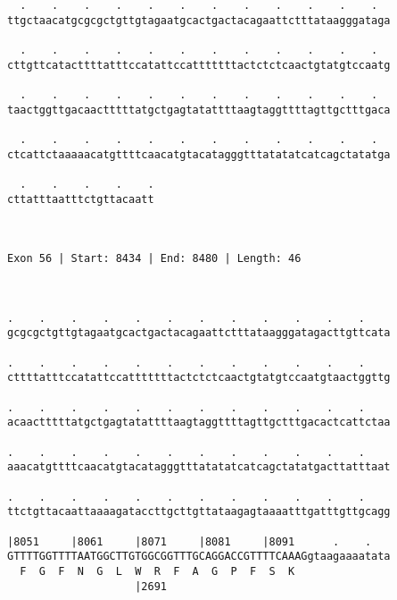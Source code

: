 \documentclass{article}
\begin{document}
\begin{Verbatim}
  .    .    .    .    .    .    .    .    .    .    .    .  
ttgctaacatgcgcgctgttgtagaatgcactgactacagaattctttataagggataga
                                                            
  .    .    .    .    .    .    .    .    .    .    .    .  
cttgttcatacttttatttccatattccatttttttactctctcaactgtatgtccaatg
                                                            
  .    .    .    .    .    .    .    .    .    .    .    .  
taactggttgacaactttttatgctgagtatattttaagtaggttttagttgctttgaca
                                                            
  .    .    .    .    .    .    .    .    .    .    .    .  
ctcattctaaaaacatgttttcaacatgtacatagggtttatatatcatcagctatatga
                                                            
  .    .    .    .    .
cttatttaatttctgttacaatt
                       
                       
 
Exon 56 | Start: 8434 | End: 8480 | Length: 46



.    .    .    .    .    .    .    .    .    .    .    .    
gcgcgctgttgtagaatgcactgactacagaattctttataagggatagacttgttcata
                                                            
.    .    .    .    .    .    .    .    .    .    .    .    
cttttatttccatattccatttttttactctctcaactgtatgtccaatgtaactggttg
                                                            
.    .    .    .    .    .    .    .    .    .    .    .    
acaactttttatgctgagtatattttaagtaggttttagttgctttgacactcattctaa
                                                            
.    .    .    .    .    .    .    .    .    .    .    .    
aaacatgttttcaacatgtacatagggtttatatatcatcagctatatgacttatttaat
                                                            
.    .    .    .    .    .    .    .    .    .    .    .    
ttctgttacaattaaaagataccttgcttgttataagagtaaaatttgatttgttgcagg
                                                            
|8051     |8061     |8071     |8081     |8091      .    .   
GTTTTGGTTTTAATGGCTTGTGGCGGTTTGCAGGACCGTTTTCAAAGgtaagaaaatata
  F  G  F  N  G  L  W  R  F  A  G  P  F  S  K               
                    |2691                                   
  

\end{Verbatim}
\end{document}
